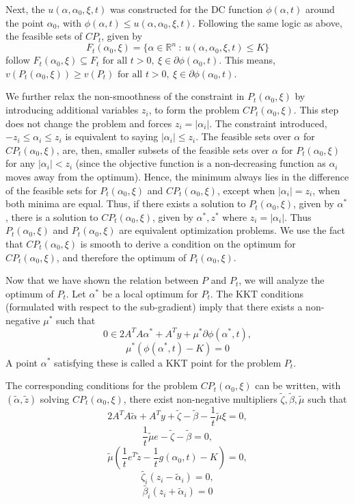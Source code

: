 \documentclass[letterpaper, 10 pt, conference]{article}
\begin{document}
Next, the $u(\alpha, \alpha_0, \xi, t)$ was constructed for the DC function $\phi(\alpha, t)$ around the point $\alpha_0$, with $\phi(\alpha, t) \leq u(\alpha, \alpha_0, \xi, t)$. Following the same logic as above, the feasible sets of $CP_t$, given by $$F_t(\alpha_0, \xi) = \{ \alpha \in \mathbb{R}^n \ :\ u(\alpha, \alpha_0, \xi, t) \leq K \}$$ follow $F_t(\alpha_0, \xi) \subseteq F_t \text{ for all } t > 0,\  \xi \in \partial\phi(\alpha_0, t)$. This means, $v(P_t(\alpha_0, \xi)) \geq v(P_t)\text{ for all } t > 0,\  \xi \in \partial\phi(\alpha_0, t)$.

We further relax the non-smoothness of the constraint in $P_t(\alpha_0, \xi)$ by introducing additional variables $z_i$, to form the problem $CP_t(\alpha_0, \xi)$. This step does not change the problem and forces $z_i = |\alpha_i|$. The constraint introduced, $-z_i \leq \alpha_i \leq z_i$ is equivalent to saying $|\alpha_i| \leq z_i$. The feasible sets over $\alpha$ for $CP_t(\alpha_0, \xi)$, are, then, smaller subsets of the feasible sets over $\alpha$ for $P_t(\alpha_0, \xi)$ for any $|\alpha_i| < z_i$ (since the objective function is a non-decreasing function as $\alpha_i$ moves away from the optimum). Hence, the minimum always lies in the difference of the feasible sets for $P_t(\alpha_0, \xi)$ and $CP_t(\alpha_0, \xi)$, except when $|\alpha_i| = z_i$, when both minima are equal. Thus, if there exists a solution to $P_t(\alpha_0, \xi)$, given by $\alpha^*$, there is a solution to $CP_t(\alpha_0, \xi)$, given by $\alpha^*, z^*$ where $z_i = |\alpha_i|$. Thus $P_t(\alpha_0, \xi)$ and $P_t(\alpha_0, \xi)$ are equivalent optimization problems. We use the fact that $CP_t(\alpha_0, \xi)$ is smooth to derive a condition on the optimum for $CP_t(\alpha_0, \xi)$, and therefore the optimum of $P_t(\alpha_0, \xi)$.

Now that we have shown the relation between $P$ and $P_t$, we will analyze the optimum of $P_t$. Let $\alpha^*$ be a local optimum for $P_t$. The KKT conditions (formulated with respect to the sub-gradient) imply that there exists a non-negative $\mu^*$ such that
$$0 \in 2A^TA\alpha^* + A^Ty + \mu^* \partial \phi(\alpha^*, t),$$
$$\mu^* (\phi(\alpha^*, t) - K) = 0$$
A point $\alpha^*$ satisfying these is called a KKT point for the problem $P_t$. 

The corresponding conditions for the problem $CP_t(\alpha_0, \xi)$ can be written, with $(\tilde{\alpha}, \tilde{z})$ solving $CP_t(\alpha_0, \xi)$, there exist non-negative multipliers $\tilde{\zeta}, \tilde{\beta}, \tilde{\mu}$ such that
$$2A^TA\tilde{\alpha} + A^Ty + \tilde{\zeta} - \tilde{\beta} - \frac{1}{t}\tilde{\mu}\xi = 0,$$
$$\frac{1}{t}\tilde{\mu}e - \tilde{\zeta} - \tilde{\beta} = 0,$$
$$\tilde{\mu} \left( \frac{1}{t} e^T \tilde{z} - \frac{1}{t} g(\alpha_0, t) - K \right) = 0,$$
$$\tilde{\zeta_i} (z_i - \tilde{\alpha}_i) = 0,$$
$$\tilde{\beta_i} (z_i + \tilde{\alpha}_i) = 0$$
\end{document}
